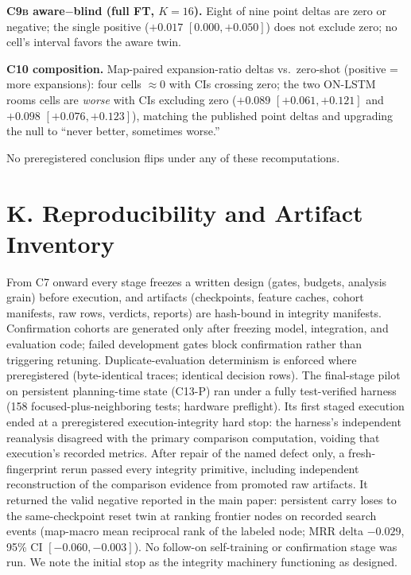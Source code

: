 \documentclass[letterpaper]{article} %
\newcommand{\stage}[1]{\textsc{#1}}
\begin{document}
\textbf{\stage{C9b} aware$-$blind (full FT, $K{=}16$).} Eight of nine point deltas are zero or negative; the single positive ($+0.017$ $[0.000,+0.050]$) does not exclude zero; no cell's interval favors the aware twin.

\textbf{\stage{C10} composition.} Map-paired expansion-ratio deltas vs.\ zero-shot (positive = more expansions): four cells $\approx$0 with CIs crossing zero; the two ON-LSTM rooms cells are \emph{worse} with CIs excluding zero ($+0.089$ $[+0.061,+0.121]$ and $+0.098$ $[+0.076,+0.123]$), matching the published point deltas and upgrading the null to ``never better, sometimes worse.''

No preregistered conclusion flips under any of these recomputations.

\section{K. Reproducibility and Artifact Inventory}

From \stage{C7} onward every stage freezes a written design (gates, budgets, analysis grain) before execution, and artifacts (checkpoints, feature caches, cohort manifests, raw rows, verdicts, reports) are hash-bound in integrity manifests. Confirmation cohorts are generated only after freezing model, integration, and evaluation code; failed development gates block confirmation rather than triggering retuning. Duplicate-evaluation determinism is enforced where preregistered (byte-identical traces; identical decision rows). The final-stage pilot on persistent planning-time state (\stage{C13-P}) ran under a fully test-verified harness (158 focused-plus-neighboring tests; hardware preflight). Its first staged execution ended at a preregistered execution-integrity hard stop: the harness's independent reanalysis disagreed with the primary comparison computation, voiding that execution's recorded metrics. After repair of the named defect only, a fresh-fingerprint rerun passed every integrity primitive, including independent reconstruction of the comparison evidence from promoted raw artifacts. It returned the valid negative reported in the main paper: persistent carry loses to the same-checkpoint reset twin at ranking frontier nodes on recorded search events (map-macro mean reciprocal rank of the labeled node; MRR delta $-0.029$, 95\% CI $[-0.060,-0.003]$). No follow-on self-training or confirmation stage was run. We note the initial stop as the integrity machinery functioning as designed.
\end{document}
